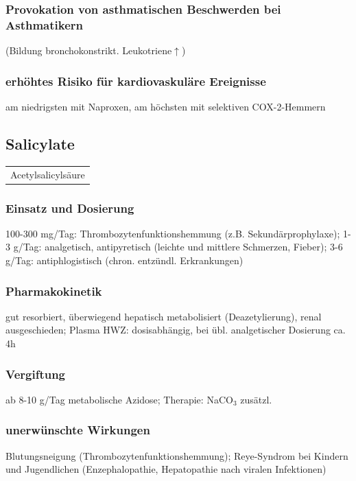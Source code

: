\documentclass[10pt,a4paper]{report}
\begin{document}
\subsubsection{ Provokation von asthmatischen Beschwerden bei Asthmatikern} %
\label{par:_provokation_von_asthmatischen_beschwerden_bei_asthmatikern}
(Bildung bronchokonstrikt. Leukotriene$\uparrow$)
\subsubsection{erhöhtes Risiko für kardiovaskuläre Ereignisse} %
am niedrigsten mit 	Naproxen, am höchsten mit selektiven COX-2-Hemmern
\subsection{Salicylate} %
\label{ssub:salicylate}
\begin{tabularx}{\textwidth}{X}
Acetylsalicylsäure\\
\end{tabularx}
\subsubsection{Einsatz und Dosierung} %
\label{par:einsatz_und_dosierung}
100-300 mg/Tag: Thrombozytenfunktionshemmung 
(z.B. Sekundärprophylaxe); 1-3 g/Tag: analgetisch, antipyretisch (leichte und mittlere Schmerzen, Fieber); 3-6 g/Tag: antiphlogistisch (chron. entzündl. Erkrankungen)
\subsubsection{Pharmakokinetik} %
\label{par:pharmakokinetik}
 gut resorbiert, überwiegend hepatisch metabolisiert (Deazetylierung), renal ausgeschieden; 	Plasma HWZ: dosisabhängig, bei übl. analgetischer Dosierung ca. 4h
\subsubsection{Vergiftung} %
\label{par:vergiftung}
ab 8-10 g/Tag metabolische Azidose; Therapie: NaCO$_3$ zusätzl.
\subsubsection{unerwünschte Wirkungen} %
\label{par:unerw_nschte_wirkungen}
Blutungsneigung (Thrombozytenfunktionshemmung); Reye-Syndrom bei Kindern und Jugendlichen (Enzephalopathie, Hepatopathie nach viralen Infektionen)
\end{document}
